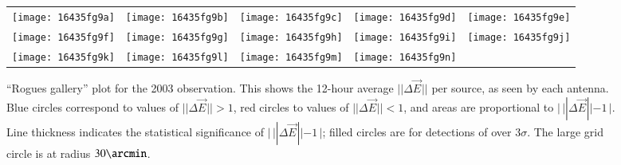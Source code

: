 \documentclass{aa}
\newcommand{\jones}[2]{\vec {#1}_{#2}}
\begin{document}
\begin{figure}
\centering
\begin{tabular}{@{}c@{}c@{}c@{}c@{}c@{}}
\texttt{[image: 16435fg9a]} &
\texttt{[image: 16435fg9b]} &
\texttt{[image: 16435fg9c]} &
\texttt{[image: 16435fg9d]} &
\texttt{[image: 16435fg9e]} \\
\texttt{[image: 16435fg9f]} &
\texttt{[image: 16435fg9g]} &
\texttt{[image: 16435fg9h]} &
\texttt{[image: 16435fg9i]} &
\texttt{[image: 16435fg9j]} \\
\texttt{[image: 16435fg9k]} &
\texttt{[image: 16435fg9l]} &
\texttt{[image: 16435fg9m]} &
\texttt{[image: 16435fg9n]} 
\end{tabular}
\caption{\label{fig:rogues-2003}``Rogues gallery'' plot for the 2003 observation. This shows the 12-hour average $||\Delta\jones{E}{}||$ per source, as seen by each antenna. Blue circles correspond to values of $||\Delta\jones{E}{}||>1$, red circles to values of $||\Delta\jones{E}{}||<1$, and areas are proportional to $|\,||\Delta\jones{E}{}||-1\,|$. Line thickness indicates the statistical significance of $|\,||\Delta\jones{E}{}||-1\,|$; filled circles are for detections of over $3\sigma$. The large grid circle is at radius $30\arcmin$.}
\end{figure}
\end{document}
